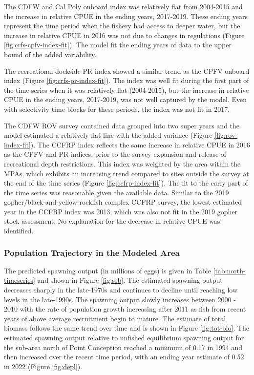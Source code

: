 \documentclass[11pt,
  english,
  letterpaper,
]{article}
\begin{document}
The CDFW and Cal Poly onboard index was relatively flat from 2004-2015 and the increase in relative CPUE in the ending years, 2017-2019. These ending years represent the time period when the fishery had access to deeper water, but the increase in relative CPUE in 2016 was not due to changes in regulations (Figure \ref{fig:crfs-cpfv-index-fit}). The model fit the ending years of data to the upper bound of the added variability.

The recreational dockside PR index showed a similar trend as the CPFV onboard index (Figure \ref{fig:crfs-pr-index-fit}). The index was well fit during the first part of the time series when it was relatively flat (2004-2015), but the increase in relative CPUE in the ending years, 2017-2019, was not well captured by the model. Even with selectivity time blocks for these periods, the index was not fit in 2017.

The CDFW ROV survey contained data grouped into two super years and the model estimated a relatively flat line with the added variance (Figure \ref{fig:rov-index-fit}). The CCFRP index reflects the same increase in relative CPUE in 2016 as the CPFV and PR indices, prior to the survey expansion and release of recreational depth restrictions. This index was weighted by the area within the MPAs, which exhibits an increasing trend compared to sites outside the survey at the end of the time series (Figure \ref{fig:ccfrp-index-fit}). The fit to the early part of the time series was reasonable given the available data. Similar to the 2019 gopher/black-and-yellow rockfish complex CCFRP survey, the lowest estimated year in the CCFRP index was 2013, which was also not fit in the 2019 gopher stock assessment. No explanation for the decrease in relative CPUE was identified.

\hypertarget{population-trajectory-in-the-modeled-area}{%
\subsubsection{Population Trajectory in the Modeled Area}\label{population-trajectory-in-the-modeled-area}}

The predicted spawning output (in millions of eggs) is given in Table \ref{tab:north-timeseries} and shown in Figure \ref{fig:ssb}. The estimated spawning output decreases sharply in the late-1970s and continues to decline until reaching low levels in the late-1990s. The spawning output slowly increases between 2000 - 2010 with the rate of population growth increasing after 2011 as fish from recent years of above average recruitment begin to mature. The estimate of total biomass follows the same trend over time and is shown in Figure \ref{fig:tot-bio}. The estimated spawning output relative to unfished equilibrium spawning output for the sub-area north of Point Conception reached a minimum of 0.17 in 1994 and then increased over the recent time period, with an ending year estimate of 0.52 in 2022 (Figure \ref{fig:depl}).
\end{document}
